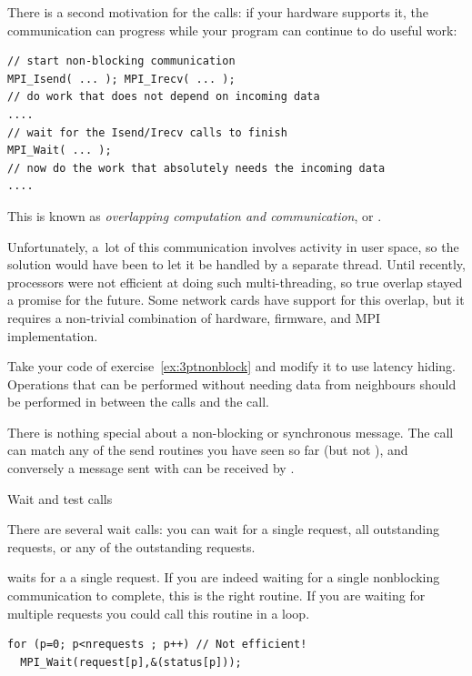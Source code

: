There is a second motivation for the  calls:
if your hardware supports it, the communication can progress
while your program can continue to do useful work:
\begin{lstlisting}
// start non-blocking communication
MPI_Isend( ... ); MPI_Irecv( ... );
// do work that does not depend on incoming data
....
// wait for the Isend/Irecv calls to finish
MPI_Wait( ... );
// now do the work that absolutely needs the incoming data
....
\end{lstlisting}
This is known as \emph{overlapping computation and communication}, or
.

Unfortunately, a~lot of this
communication involves activity in user space, so the solution would
have been to let it be handled by a separate thread. Until recently,
processors were not efficient at doing such multi-threading, so true
overlap stayed a promise for the future. Some network cards have
support for this overlap, but it requires a non-trivial combination of
hardware, firmware, and MPI implementation.

\begin{exercise}
  \label{ex:3ptnonblock-hide}
  Take your code of exercise~\ref{ex:3ptnonblock} and modify it to use
  latency hiding. Operations that can be performed without needing
  data from neighbours should be performed in between the
   calls and the  call.
\end{exercise}

\begin{remark}
  There is nothing special about a non-blocking or
  synchronous message. The  call can match any of the
  send routines you have seen so far (but not ), and
  conversely a message sent with  can be received by .
\end{remark}

 {Wait and test calls}
\label{sec:waittest}

There are several wait calls: you can wait for a single request, all
outstanding requests, or any of the outstanding requests.


 waits for a a single request. If you are
indeed waiting for a single nonblocking communication to complete,
this is the right routine. If you are waiting for multiple requests
you could call this routine in a loop.

\begin{lstlisting}
for (p=0; p<nrequests ; p++) // Not efficient!
  MPI_Wait(request[p],&(status[p]));
\end{lstlisting}

